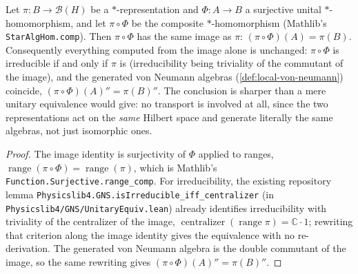 \begin{lemma}
    \label{lmm:pullback-image-invariants}
    \leanok
    Let $\pi : B \to \mathcal{B}(H)$ be a $*$-representation and $\Phi : A \to B$ a surjective unital $*$-homomorphism, and let $\pi \circ \Phi$ be the composite $*$-homomorphism (Mathlib's \texttt{StarAlgHom.comp}). Then $\pi \circ \Phi$ has the same image as $\pi$: $(\pi \circ \Phi)(A) = \pi(B)$. Consequently everything computed from the image alone is unchanged: $\pi \circ \Phi$ is irreducible if and only if $\pi$ is (irreducibility being triviality of the commutant of the image), and the generated von Neumann algebras (\ref{def:local-von-neumann}) coincide, $(\pi \circ \Phi)(A)'' = \pi(B)''$. The conclusion is sharper than a mere unitary equivalence would give: no transport is involved at all, since the two representations act on the \emph{same} Hilbert space and generate literally the same algebras, not just isomorphic ones.
\end{lemma}
\begin{proof}
    \leanok
    The image identity is surjectivity of $\Phi$ applied to ranges, $\operatorname{range}(\pi \circ \Phi) = \operatorname{range}(\pi)$, which is Mathlib's \texttt{Function.Surjective.range\_comp}. For irreducibility, the existing repository lemma \texttt{Physicslib4.GNS.isIrreducible\_iff\_centralizer} (in \texttt{Physicslib4/GNS/UnitaryEquiv.lean}) already identifies irreducibility with triviality of the centralizer of the image, $\operatorname{centralizer}(\operatorname{range} \pi) = \mathbb{C} \cdot 1$; rewriting that criterion along the image identity gives the equivalence with no re-derivation. The generated von Neumann algebra is the double commutant of the image, so the same rewriting gives $(\pi \circ \Phi)(A)'' = \pi(B)''$.
\end{proof}

